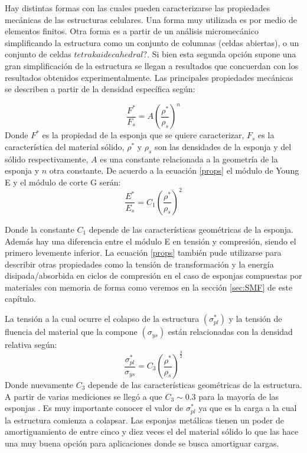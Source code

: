 \documentclass[a4paper,12pt,fleqn,twoside,openany]{book}
\begin{document}
Hay distintas formas con las cuales pueden caracterizarse las propiedades mecánicas de las estructuras celulares. Una forma muy utilizada es por medio 
de elementos finitos. Otra forma
es a partir de un análisis micromecánico simplificando la estructura como un conjunto de columnas (celdas abiertas), o un conjunto 
de celdas $tetrakaidecahedral?$. Si bien esta segunda opción supone una gran simplificación de la estructura se llegan a resultados que concuerdan con los 
resultados obtenidos experimentalmente. Las principales propiedades mecánicas se describen a partir de la densidad específica según:

\begin{equation}
\frac{F^*}{F_s}=A \left(\frac{\rho^*}{\rho_s}\right)^n \label{props} 
\end{equation}
Donde $F^*$ es la propiedad de la esponja que se quiere caracterizar, $F_s$ es la característica del material sólido, $\rho^*$ y $\rho_s$ son las 
densidades de la esponja y del sólido respectivamente, $A$ es una constante relacionada a la geometría de la esponja y $n$ otra constante. De acuerdo 
a la ecuación \ref{props} el módulo de Young E y el módulo de corte G \cite{duering} serán:
\begin{equation}
\frac{E^*}{E_s}=C_1 \left(\frac{\rho^*}{\rho_s}\right)^2 \label{propsE}  
\end{equation}

Donde la constante $C_1$ depende de las características geométricas de la esponja. 
Además hay una diferencia entre el módulo E en tensión y compresión, siendo el primero levemente inferior. La ecuación \ref{props} también pude utilizarse 
para describir otras propiedades como la tensión de transformación y la energía disipada/absorbida en ciclos de compresión en el caso de esponjas 
compuestas por materiales con memoria de forma como veremos en la sección \ref{sec:SMF} de este capítulo. 

La tensión a la cual ocurre el colapso de la estructura $(\sigma^*_{pl})$ y la tensión de fluencia del material que la compone $(\sigma_{ys})$ 
están relacionadas con la densidad relativa según:
\begin{equation}
 \frac{\sigma^*_{pl}}{\sigma_{ys}}=C_3 \left(\frac{\rho^*}{\rho_s} \right)^{\frac{3}{2}}
\end{equation}
Donde nuevamente $C_3$ depende de las características geométricas de la estructura. A partir de varias mediciones se llegó a que $C_3 \sim 0.3$ para
la mayoría de las esponjas \cite{gibson}. 
Es muy importante conocer el valor de $\sigma^*_{pl}$ ya que es la carga a la cual la estructura comienza a colapsar.  Las esponjas metálicas tienen 
un poder de amortiguamiento de entre cinco y diez veces el del material sólido \cite{design} lo que las hace una muy buena opción para aplicaciones 
donde se busca amortiguar cargas. 
\end{document}
